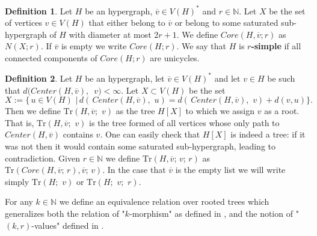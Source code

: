 \documentclass[12pt,notitlepage,a4paper]{article}
\theoremstyle{definition}
\newtheorem{definition}{Definition}[section]
\newcommand{\N}{\mathbb{N}}
\newcommand{\Tr}{\mathrm{Tr}}
\begin{document}
\begin{definition}
Let $H$ be an hypergraph, $\overline{v}\in V(H)^*$
and $r\in \N$. Let $X$ be the set of vertices $v\in V(H)$
that either belong to $\overline{v}$ or belong 
to some saturated sub-hypergraph of $H$ with
diameter at most $2r+1$. 
We define $Core(H, \overline{v};r)$ as $N(X;r)$. If
$\overline{v}$ is empty we write $Core(H;r)$.
We say that $H$ is \textbf{$r$-simple} if all connected components of 
$Core(H;r)$ are unicycles. 	
\end{definition}



\begin{definition}\label{def:TrOperator}
	Let $H$ be an hypergraph, let $\overline{v}\in V(H)^*$ and 
	let $v\in H$ be such that $d(Center(H,\overline{v}),$ $ \, v)<\infty$. 
	Let $X\subset V(H)$ be the set
	\[
	X:=\big\{\, u\in V(H) \,\, \big| \, 
	d\left(\, Center(H, \overline{v})
	, \, \, u \right)= d\left(\, Center(H, \overline{v})
	, \, \, v \right) + d(v,u)
	\big\}.
	\]
	Then we define $\mathrm{Tr}\left(
	H,\overline{v};\,\, v\right)$ as the tree $H[X]$ 		
	to which we assign $v$ as a root. That is,
	$\mathrm{Tr}\left(
	H,\overline{v};\,\, v\right)$ is the tree formed of all 
	vertices whose only path to $Center(H,\overline{v})$ 
	contains $v$. One can easily check that $H[X]$ is indeed a tree:
	if it was not then it would contain some saturated sub-hypergraph, leading
	to contradiction. 
	Given $r\in \N$ we define $\mathrm{Tr}(H,\overline{v};\, v;\, r)$ as
	$\mathrm{Tr}( Core(H,\overline{v};\,r),\overline{v}; \, v)$.
	In the case that $\overline{v}$ is the empty list we will write
	simply $\mathrm{Tr}(H;\,\, v)$ or $\Tr(H;\,\,v;\,\,r)$.
\end{definition}

For any $k\in \N$ we define an equivalence relation over rooted trees
which generalizes both the relation of "$k$-morphism" as 
defined in \cite{lynch1992probabilities},
and the notion of "$(k,r)$-values" defined in \cite{salvadorbrasil}. 
\end{document}
